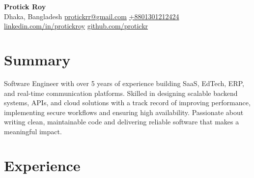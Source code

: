 \documentclass[a4paper,10pt]{article}
\begin{document}
\begin{center}
    {\Huge \textbf{Protick Roy}}\\[4pt]
    \small Dhaka, Bangladesh \textbar{}
    \href{mailto:protickrr@gmail.com}{protickrr@gmail.com} \textbar{}
    \href{tel:+8801301212424}{+8801301212424} \textbar{}
    \href{https://www.linkedin.com/in/protickroy}{linkedin.com/in/protickroy} \textbar{}
    \href{https://github.com/protickr}{github.com/protickr}
\end{center}

\vspace{8pt}

\section*{Summary}
Software Engineer with over 5 years of experience building SaaS, EdTech, ERP, and real-time communication platforms.
Skilled in designing scalable backend systems, APIs, and cloud solutions with a track record of improving performance,
implementing secure workflows and ensuring high availability.
Passionate about writing clean, maintainable code and delivering reliable software that makes a meaningful impact.

\vspace{6pt}

\section*{Experience}
\end{document}
